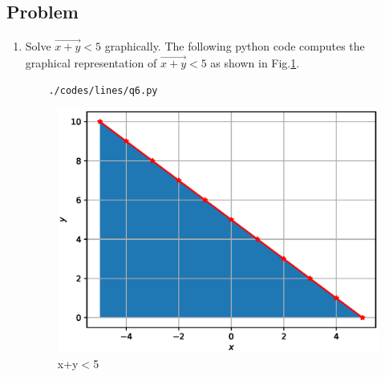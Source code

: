 \subsection{Problem}

\renewcommand{\theequation}{\theenumi}
\begin{enumerate}[label=\thesection.\arabic*.,ref=\thesection.\theenumi]
\item Solve $\vec{x+y}<5$ graphically.
The following python code computes the graphical representation of $\vec{x+y}<5$ as shown in Fig.\ref{fig:qsix}.
	\begin{lstlisting}
	./codes/lines/q6.py
	\end{lstlisting}
	\begin{figure}[!ht]
	\centering
	\includegraphics[width=\columnwidth]{./figs/lines/q6.eps}
	\caption{x+y$<$5}
	\label{fig:qsix}	
	\end{figure}
	
\end{enumerate}
